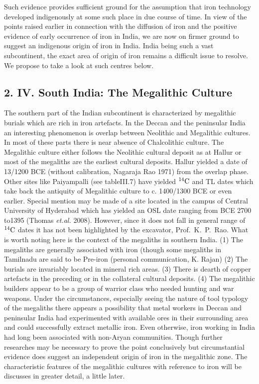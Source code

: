 Such evidence provides sufficient ground for the assumption that iron technology developed indigenously at some such place in due course of time. In view of the points raised earlier in connection with the diffusion of iron and the positive evidence of early occurrence of iron in India, we are now on firmer ground to suggest an indigenous origin of iron in India. India being such a vast subcontinent, the exact area of origin of iron remains a difficult issue to resolve. We propose to take a look at such centres below.

\vspace{-.3cm}

\subsection*{2. IV. South India: The Megalithic Culture}\label{subsection-7}

\vspace{-.2cm}

The southern part of the Indian subcontinent is characterized by megalithic burials which are rich in iron artefacts. In the Deccan and the peninsular India an interesting phenomenon is overlap between Neolithic and Megalithic cultures. In most of these parts there is near absence of Chalcolithic culture. The Megalithic culture either follows the Neolithic cultural deposit as at Hallur or most of the megaliths are the earliest cultural deposits. Hallur yielded a date of 13/1200 BCE (without calibration, Nagaraja Rao 1971) from the overlap phase. Other sites like Paiyampalli (see tableIII.7) have yielded $^{14}{\rm C}$ and TL dates which take back the antiquity of Megalithic culture to c. 1400/1300 BCE or even earlier. Special mention may be made of a site located in the campus of Central University of Hyderabad which has yielded an OSL date ranging from BCE 2700 to1395 (Thomas \textit{et.al.} 2008). However, since it does not fall in general range of $^{14}{\rm C}$ dates it has not been highlighted by the excavator, Prof.~K.~P.~Rao. What is worth noting here is the context of the megaliths in southern India. (1) The megaliths are generally associated with iron (though some megaliths in Tamilnadu are said to be Pre-iron (personal communication, K. Rajan) (2) The burials are invariably located in mineral rich areas. (3) There is dearth of copper artefacts in the preceding or in the collateral cultural deposits. (4) The megalithic builders appear to be a group of warrior class who needed hunting and war weapons. Under the circumstances, especially seeing the nature of tool typology of the megaliths there appears a possibility that metal workers in Deccan and peninsular India had experimented with available ores in their surrounding area and could successfully extract metallic iron. Even otherwise, iron working in India had long been associated with non-Aryan communities. Though further researches may be necessary to prove the point conclusively but circumstantial evidence does suggest an independent origin of iron in the megalithic zone. The characteristic features of the megalithic cultures with reference to iron will be discusses in greater detail, a little later.

